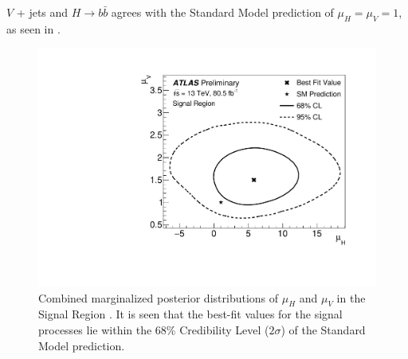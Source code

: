 $V$ + jets and $H \rightarrow b\bar{b}$ agrees with the Standard Model
prediction of $\mu_{H} = \mu_{V} = 1$, as seen in .
%
\begin{figure}[!b]
\centering
\includegraphics[width=.7\linewidth]{figures/results/contour}
\caption{
Combined marginalized posterior distributions of $\mu_{H}$ and $\mu_{V}$ in the
Signal Region \cite{ATLAS-CONF-2018-052}.  It is seen that the best-fit values for the signal processes
lie within the 68\% Credibility Level ($2\sigma$) of the Standard Model
prediction.}
\label{sec:results:contour}
\end{figure}
